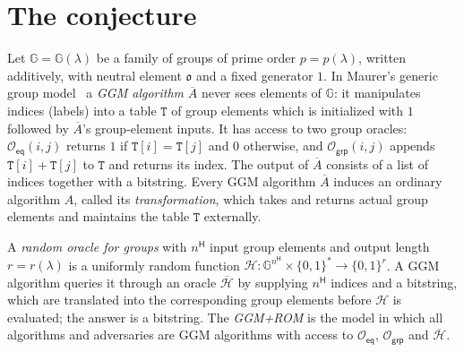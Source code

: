 \documentclass{aicr-conjecture}
\newcommand{\GG}{\mathbb{G}}
\newcommand{\HH}{\mathcal{H}}
\newcommand{\Oeq}{\mathcal{O}_{\mathsf{eq}}}
\newcommand{\Ogrp}{\mathcal{O}_{\mathsf{grp}}}
\begin{document}
\section{The conjecture}\label{sec:conjectures}

\begin{definition}\label{def:ggmrom}
Let $\GG=\GG(\lambda)$ be a family of groups of prime order
$p=p(\lambda)$, written additively, with neutral element $\mathfrak{o}$
and a fixed generator $\mathfrak{1}$. In Maurer's generic group
model~\cite{Mau05} a \emph{GGM algorithm} $\overline{A}$ never sees
elements of $\GG$: it manipulates indices (labels) into a table
$\mathtt{T}$ of group elements which is initialized with $\mathfrak{1}$
followed by $\overline{A}$'s group-element inputs. It has access to two
group oracles: $\Oeq(i,j)$ returns $1$ if $\mathtt{T}[i]=\mathtt{T}[j]$
and $0$ otherwise, and $\Ogrp(i,j)$ appends $\mathtt{T}[i]+\mathtt{T}[j]$
to $\mathtt{T}$ and returns its index. The output of $\overline{A}$
consists of a list of indices together with a bitstring. Every GGM
algorithm $\overline{A}$ induces an ordinary algorithm $A$, called its
\emph{transformation}, which takes and returns actual group elements and
maintains the table $\mathtt{T}$ externally.

A \emph{random oracle for groups} with $n^{\mathsf{H}}$ input group
elements and output length $r=r(\lambda)$ is a uniformly random function
$\HH:\GG^{n^{\mathsf{H}}}\times\{0,1\}^{*}\to\{0,1\}^{r}$. A GGM
algorithm queries it through an oracle $\overline{\HH}$ by supplying
$n^{\mathsf{H}}$ indices and a bitstring, which are translated into the
corresponding group elements before $\HH$ is evaluated; the answer is a
bitstring. The \emph{GGM+ROM} is the model in which all algorithms and
adversaries are GGM algorithms with access to $\Oeq$, $\Ogrp$ and
$\overline{\HH}$.
\end{definition}
\end{document}
